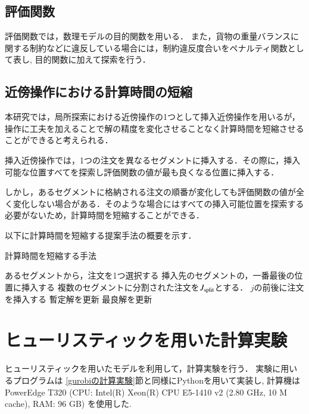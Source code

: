 \documentclass[a4j,11pt,twocolumn]{jsarticle}
\begin{document}
\subsection{評価関数}
評価関数では，数理モデル\cite{ukawa}の目的関数を用いる．
また，貨物の重量バランスに関する制約などに違反している場合には，制約違反度合いをペナルティ関数として表し, 目的関数に加えて探索を行う．

\subsection{近傍操作における計算時間の短縮}
\label{近傍操作の計算時間短縮}
本研究では，局所探索における近傍操作の1つとして挿入近傍操作を用いるが，操作に工夫を加えることで解の精度を変化させることなく計算時間を短縮させることができると考えられる．

挿入近傍操作では，1つの注文を異なるセグメントに挿入する．その際に，挿入可能な位置すべてを探索し評価関数の値が最も良くなる位置に挿入する．

しかし，あるセグメントに格納される注文の順番が変化しても評価関数の値が全く変化しない場合がある．そのような場合にはすべての挿入可能位置を探索する必要がないため，計算時間を短縮することができる．

以下に計算時間を短縮する提案手法の概要を示す．

\begin{algorithm}
 \caption{計算時間を短縮する手法}
 \label{algo1}
 \begin{algorithmic}[1]%
  \STATE あるセグメントから，注文を1つ選択する
  \STATE 挿入先のセグメントの，一番最後の位置に挿入する
  \STATE 複数のセグメントに分割された注文を$J_{\rm split}$とする．
  \STATE $j$の前後に注文を挿入する
  \STATE 暫定解を更新
  \ENDIF
  \ENDFOR
  \STATE 最良解を更新
  \ENDIF
 \end{algorithmic}
\end{algorithm}


\section{ヒューリスティックを用いた計算実験}
ヒューリスティックを用いたモデルを利用して，計算実験を行う．
実験に用いるプログラムは \ref{gurobiの計算実験}節と同様にPythonを用いて実装し, 計算機はPowerEdge T320 (CPU: Intel(R) Xeon(R) CPU E5-1410 v2 (2.80 GHz, 10 M cache), RAM: 96 GB) を使用した.
\end{document}
